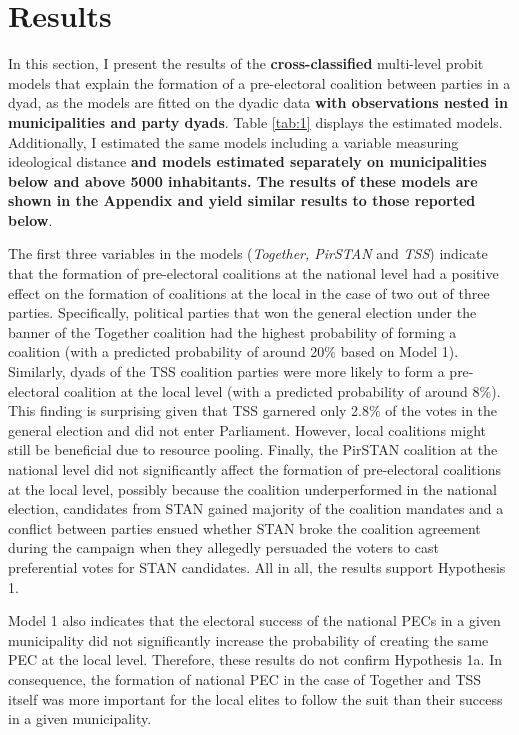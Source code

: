 \documentclass[]{interact}
\theoremstyle{plain}%
\theoremstyle{definition}
\theoremstyle{remark}
\begin{document}
\section{Results}

In this section, I present the results of the \textbf{cross-classified} multi-level probit models that explain the formation of a pre-electoral coalition between parties in a dyad, as the models are fitted on the dyadic data \textbf{with observations nested in municipalities and party dyads}. Table \ref{tab:1} displays the estimated models. Additionally, I estimated the same models including a variable measuring ideological distance \textbf{and models estimated separately on municipalities below and above 5000 inhabitants. The results of these models are shown in the Appendix and yield similar results to those reported below}.

The first three variables in the models (\emph{Together, PirSTAN} and \emph{TSS}) indicate that the formation of pre-electoral coalitions at the national level had a positive effect on the formation of coalitions at the local in the case of two out of three parties. Specifically, political parties that won the general election under the banner of the Together coalition had the highest probability of forming a coalition (with a predicted probability of around 20\% based on Model 1). Similarly, dyads of the TSS coalition parties were more likely to form a pre-electoral coalition at the local level (with a predicted probability of around 8\%). This finding is surprising given that TSS garnered only 2.8\% of the votes in the general election and did not enter Parliament. However, local coalitions might still be beneficial due to resource pooling. Finally, the PirSTAN coalition at the national level did not significantly affect the formation of pre-electoral coalitions at the local level, possibly because the coalition underperformed in the national election, candidates from STAN gained majority of the coalition mandates and a conflict between parties ensued whether STAN broke the coalition agreement during the campaign when they allegedly persuaded the voters to cast preferential votes for STAN candidates. All in all, the results support Hypothesis 1.

Model 1 also indicates that the electoral success of the national PECs in a given municipality did not significantly increase the probability of creating the same PEC at the local level. Therefore, these results do not confirm Hypothesis 1a. In consequence, the formation of national PEC in the case of Together and TSS itself was more important for the local elites to follow the suit than their success in a given municipality. 
\end{document}
